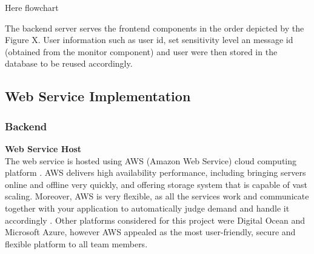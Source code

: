 \documentclass[a4paper,11pt]{article}
\begin{document}
Here flowchart 

The backend server serves the frontend components in the order depicted by the Figure X. User information such as user id, set sensitivity level an message id (obtained from the monitor component) and user were then stored in the database to be reused accordingly.

\subsection{Web Service Implementation}

\subsubsection{Backend}

\textbf{Web Service Host}\\
The web service is hosted using AWS (Amazon Web Service) cloud computing platform . AWS delivers high availability performance, including bringing servers online and offline very quickly, and offering storage system that is capable of vast scaling. Moreover, AWS is very flexible, as all the services work and communicate together with your application to automatically judge demand and handle it accordingly . Other platforms considered for this project were Digital Ocean and Microsoft Azure, however AWS appealed as the most user-friendly, secure and flexible platform to all team members.\\\\
\end{document}
